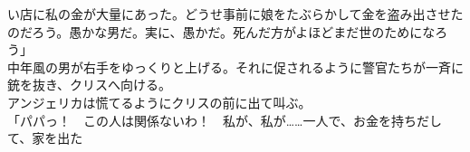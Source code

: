 \documentclass[b5j,10pt,openany]{jsbook}
\begin{document}
い店に私の金が大量にあった。どうせ事前に娘をたぶらかして金を盗み出させたのだろう。愚かな男だ。実に、愚かだ。死んだ方がよほどまだ世のためになろう」\\中年風の男が右手をゆっくりと上げる。それに促されるように警官たちが一斉に銃を抜き、クリスへ向ける。\\アンジェリカは慌てるようにクリスの前に出て叫ぶ。\\「パパっ！　この人は関係ないわ！　私が、私が\ldots{}\ldots{}一人で、お金を持ちだして、家を出た
\end{document}
